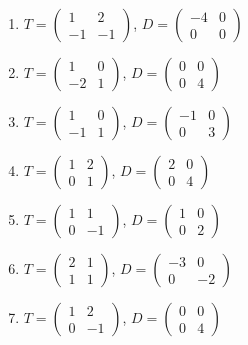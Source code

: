 \begin{enumerate}[label=\arabic*., leftmargin=*, itemsep=1pt]
\item $T=\left(\begin{smallmatrix}1 & 2\\ -1 & -1\end{smallmatrix}\right)$, $D=\left(\begin{smallmatrix}-4 & 0\\ 0 & 0\end{smallmatrix}\right)$
\item $T=\left(\begin{smallmatrix}1 & 0\\ -2 & 1\end{smallmatrix}\right)$, $D=\left(\begin{smallmatrix}0 & 0\\ 0 & 4\end{smallmatrix}\right)$
\item $T=\left(\begin{smallmatrix}1 & 0\\ -1 & 1\end{smallmatrix}\right)$, $D=\left(\begin{smallmatrix}-1 & 0\\ 0 & 3\end{smallmatrix}\right)$
\item $T=\left(\begin{smallmatrix}1 & 2\\ 0 & 1\end{smallmatrix}\right)$, $D=\left(\begin{smallmatrix}2 & 0\\ 0 & 4\end{smallmatrix}\right)$
\item $T=\left(\begin{smallmatrix}1 & 1\\ 0 & -1\end{smallmatrix}\right)$, $D=\left(\begin{smallmatrix}1 & 0\\ 0 & 2\end{smallmatrix}\right)$
\item $T=\left(\begin{smallmatrix}2 & 1\\ 1 & 1\end{smallmatrix}\right)$, $D=\left(\begin{smallmatrix}-3 & 0\\ 0 & -2\end{smallmatrix}\right)$
\item $T=\left(\begin{smallmatrix}1 & 2\\ 0 & -1\end{smallmatrix}\right)$, $D=\left(\begin{smallmatrix}0 & 0\\ 0 & 4\end{smallmatrix}\right)$

\end{enumerate}
